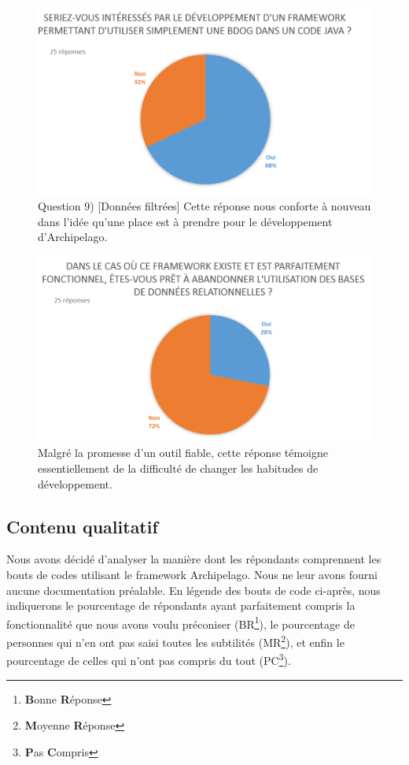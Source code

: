 \documentclass[a4paper,fleqn,12pt,oneside]{report}
\begin{document}
\begin{figure}[!ht]
\centering
\includegraphics[scale=0.8]{figures/QFrameworkIntFilt.png}
\caption{Question 9) [Données filtrées] Cette réponse nous conforte à nouveau dans l'idée qu'une place est à prendre pour le développement d'Archipelago.}
\label{fig:QFrameworkIntFilt}
\end{figure}

\newpage
{}

\begin{figure}[!ht]
\centering
\includegraphics[scale=0.8]{figures/QAbanFilt.png}
\caption{Malgré la promesse d'un outil fiable, cette réponse témoigne essentiellement de la difficulté de changer les habitudes de développement.}
\label{fig:QAbanFilt}
\end{figure}



\subsection{Contenu qualitatif}
Nous avons décidé d'analyser la manière dont les répondants comprennent les bouts de codes utilisant le framework Archipelago. Nous ne leur avons fourni aucune documentation préalable. En légende des bouts de code ci-après, nous indiquerons le pourcentage de répondants ayant parfaitement compris la fonctionnalité que nous avons voulu préconiser (BR\footnote{\textbf{B}onne \textbf{R}éponse}), le pourcentage de personnes qui n'en ont pas saisi toutes les subtilités (MR\footnote{\textbf{M}oyenne \textbf{R}éponse}), et enfin
le pourcentage de celles qui n'ont pas compris du tout (PC\footnote{\textbf{P}as \textbf{C}ompris}).
\end{document}
